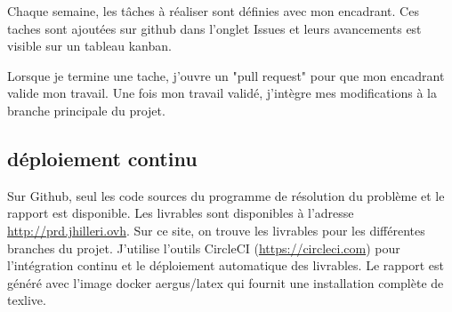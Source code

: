 Chaque semaine, les tâches à réaliser sont définies avec mon encadrant.
Ces taches sont ajoutées sur github dans l'onglet Issues et leurs avancements est visible sur un tableau kanban.

Lorsque je termine une tache, j'ouvre un "pull request" pour que mon encadrant valide mon travail.
Une fois mon travail validé, j'intègre mes modifications à la branche principale du projet.

\subsection{déploiement continu}
Sur Github, seul les code sources du programme de résolution du problème et le rapport est disponible.
Les livrables sont disponibles à l'adresse \url{http://prd.jhilleri.ovh}.
Sur ce site, on trouve les livrables pour les différentes branches du projet.
J'utilise l'outils CircleCI (\url{https://circleci.com}) pour l'intégration continu 
    et le déploiement automatique des livrables.
Le rapport est généré avec l'image docker aergus/latex qui fournit une installation complète de texlive.
